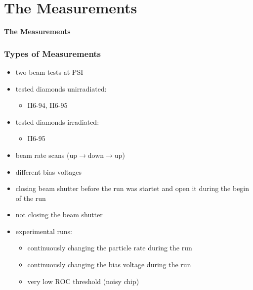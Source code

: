\documentclass[9pt]{beamer}
\begin{document}
\section{The Measurements}
\begin{frame}
	\begin{alertblock}{
		\begin{center}
			\Large{\textbf{The Measurements}}
		\end{center}}
	\end{alertblock}
\end{frame}
\begin{frame}
	\frametitle{Types of Measurements}
	\begin{itemize}
		\item two beam tests at PSI
		\item tested diamonds unirradiated:
			\begin{itemize}
				\item II6-94, II6-95
			\end{itemize}
		\item tested diamonds irradiated:
			\begin{itemize}
				\item II6-95
			\end{itemize}
		\item beam rate scans (up$\rightarrow$down$\rightarrow$up)
		\item different bias voltages
		\item closing beam shutter before the run was startet and open it during the begin of the run
		\item not closing the beam shutter
		\item experimental runs:
		\begin{itemize}
			\item continuously changing the particle rate during the run
			\item continuously changing the bias voltage during the run
			\item very low ROC threshold (noisy chip)
		\end{itemize}
	\end{itemize}
\end{frame}
\end{document}
